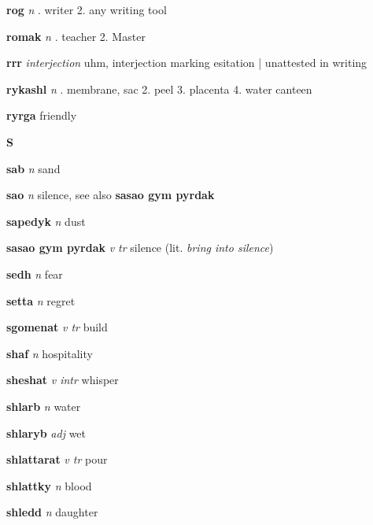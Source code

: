 \textbf{rog}   \emph{n} . writer 2. any writing tool 

\textbf{romak}   \emph{n} . teacher 2. Master 

\textbf{rrr}   \emph{interjection} \textperiodcentered uhm, interjection marking esitation | unattested in writing

\textbf{rykashl}   \emph{n} . membrane, sac 2. peel 3. placenta 4. water canteen 

\textbf{ryrga}    \textperiodcentered friendly

\begin{center} \Huge \bfseries S \end{center}\textbf{sab}   \emph{n} \textperiodcentered sand

\textbf{sao}   \emph{n} \textperiodcentered silence, see also \textbf{sasao gym pyrdak}

\textbf{sapedyk}   \emph{n} \textperiodcentered dust

\textbf{sasao gym pyrdak}   \emph{v tr} \textperiodcentered silence (lit. \emph{bring into silence})

\textbf{sedh}   \emph{n} \textperiodcentered fear

\textbf{setta}   \emph{n} \textperiodcentered regret

\textbf{sgomenat}   \emph{v tr} \textperiodcentered build

\textbf{shaf}   \emph{n} \textperiodcentered hospitality

\textbf{sheshat}   \emph{v intr} \textperiodcentered whisper

\textbf{shlarb}   \emph{n} \textperiodcentered water

\textbf{shlaryb}   \emph{adj} \textperiodcentered wet

\textbf{shlattarat}   \emph{v tr} \textperiodcentered pour

\textbf{shlattky}   \emph{n} \textperiodcentered blood

\textbf{shledd}   \emph{n} \textperiodcentered daughter

